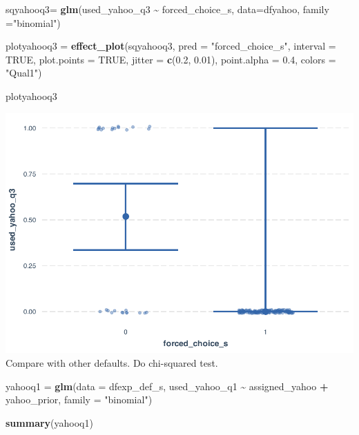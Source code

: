 \documentclass[
  11pt,
]{article}
\newenvironment{Shaded}{\begin{snugshade}}{\end{snugshade}}
\newcommand{\AttributeTok}[1]{\textcolor[rgb]{0.13,0.29,0.53}{#1}}
\newcommand{\ConstantTok}[1]{\textcolor[rgb]{0.56,0.35,0.01}{#1}}
\newcommand{\FloatTok}[1]{\textcolor[rgb]{0.00,0.00,0.81}{#1}}
\newcommand{\FunctionTok}[1]{\textcolor[rgb]{0.13,0.29,0.53}{\textbf{#1}}}
\newcommand{\NormalTok}[1]{#1}
\newcommand{\OtherTok}[1]{\textcolor[rgb]{0.56,0.35,0.01}{#1}}
\newcommand{\SpecialCharTok}[1]{\textcolor[rgb]{0.81,0.36,0.00}{\textbf{#1}}}
\newcommand{\StringTok}[1]{\textcolor[rgb]{0.31,0.60,0.02}{#1}}
\begin{document}
\begin{Shaded}
\begin{Highlighting}[]
\NormalTok{sqyahooq3}\OtherTok{=} \FunctionTok{glm}\NormalTok{(used\_yahoo\_q3 }\SpecialCharTok{\textasciitilde{}}\NormalTok{ forced\_choice\_s, }\AttributeTok{data=}\NormalTok{dfyahoo, }\AttributeTok{family =}\StringTok{"binomial"}\NormalTok{)}

\NormalTok{plotyahooq3 }\OtherTok{=} \FunctionTok{effect\_plot}\NormalTok{(sqyahooq3, }\AttributeTok{pred =} \StringTok{"forced\_choice\_s"}\NormalTok{, }\AttributeTok{interval =} \ConstantTok{TRUE}\NormalTok{, }\AttributeTok{plot.points =} \ConstantTok{TRUE}\NormalTok{, }\AttributeTok{jitter =} \FunctionTok{c}\NormalTok{(}\FloatTok{0.2}\NormalTok{, }\FloatTok{0.01}\NormalTok{), }\AttributeTok{point.alpha =} \FloatTok{0.4}\NormalTok{, }\AttributeTok{colors =} \StringTok{"Qual1"}\NormalTok{)}

\NormalTok{plotyahooq3}
\end{Highlighting}
\end{Shaded}

\includegraphics{analysis-July19_files/figure-latex/unnamed-chunk-23-1.pdf}
Compare with other defaults. Do chi-squared test.

\begin{Shaded}
\begin{Highlighting}[]
\NormalTok{yahooq1 }\OtherTok{=} \FunctionTok{glm}\NormalTok{(}\AttributeTok{data =}\NormalTok{ dfexp\_def\_s, used\_yahoo\_q1 }\SpecialCharTok{\textasciitilde{}}\NormalTok{ assigned\_yahoo }\SpecialCharTok{+}\NormalTok{ yahoo\_prior, }\AttributeTok{family =} \StringTok{"binomial"}\NormalTok{)}

\FunctionTok{summary}\NormalTok{(yahooq1)}
\end{Highlighting}
\end{Shaded}
\end{document}
